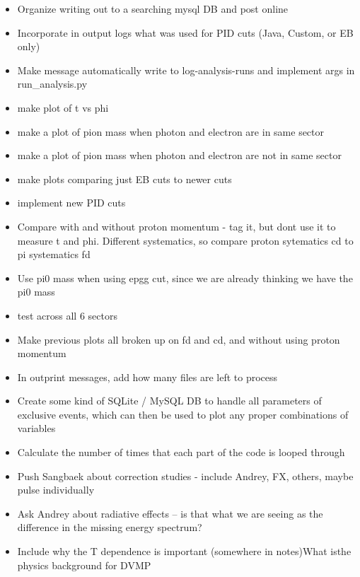 \begin{itemize}
    \item Organize writing out to a searching mysql DB and post online
    \item Incorporate in output logs what was used for PID cuts (Java, Custom, or EB only)
    \item Make message automatically write to log-analysis-runs and implement args in run\_analysis.py
    \item make plot of t vs phi
    \item make a plot of pion mass when photon and electron are in same sector
    \item make a plot of pion mass when photon and electron are not in same sector
    \item make plots comparing just EB cuts to newer cuts
    \item implement new PID cuts
    \item Compare with and without proton momentum - tag it, but dont use it to measure t and phi. Different systematics, so compare proton sytematics cd to pi systematics fd
    \item Use pi0 mass when using epgg cut, since we are already thinking we have the pi0 mass
    \item test across all 6 sectors
    \item Make previous plots all broken up on fd and cd, and without using proton momentum
    \item In outprint messages, add how many files are left to process
    \item Create some kind of SQLite / MySQL DB to handle all parameters of exclusive events, which can then be used to plot any proper combinations of variables
    \item Calculate the number of times that each part of the code is looped through
    \item Push Sangbaek about correction studies - include Andrey, FX, others, maybe pulse individually
    \item Ask Andrey about radiative effects – is that what we are seeing as the difference in the missing energy spectrum?
    \item Include why the T dependence is important (somewhere in notes)What isthe physics background for DVMP
\end{itemize}



